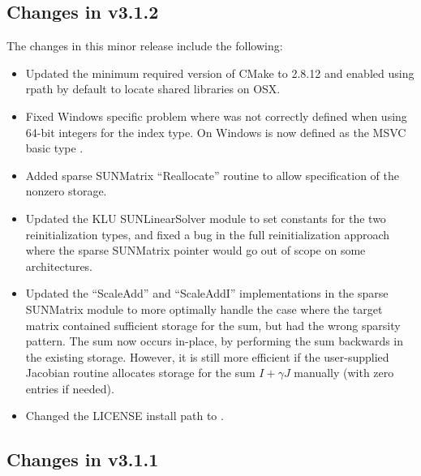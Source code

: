 \subsection*{Changes in v3.1.2}

The changes in this minor release include the following:
\begin{itemize}
\item Updated the minimum required version of CMake to 2.8.12 and enabled
  using rpath by default to locate shared libraries on OSX.
\item Fixed Windows specific problem where  was not correctly 
  defined when using 64-bit integers for the {\sundials} index type. On Windows
   is now defined as the MSVC basic type .
\item Added sparse SUNMatrix ``Reallocate'' routine to allow specification of
  the nonzero storage.
\item Updated the KLU SUNLinearSolver module to set constants for the two
  reinitialization types, and fixed a bug in the full reinitialization
  approach where the sparse SUNMatrix pointer would go out of scope on
  some architectures.
\item Updated the ``ScaleAdd'' and ``ScaleAddI'' implementations in the
  sparse SUNMatrix module to more optimally handle the case where the
  target matrix contained sufficient storage for the sum, but had the
  wrong sparsity pattern.  The sum now occurs in-place, by performing
  the sum backwards in the existing storage.  However, it is still more
  efficient if the user-supplied Jacobian routine allocates storage for
  the sum $I+\gamma J$ manually (with zero entries if needed).
\item Changed the LICENSE install path to .
\end{itemize}

\subsection*{Changes in v3.1.1}

